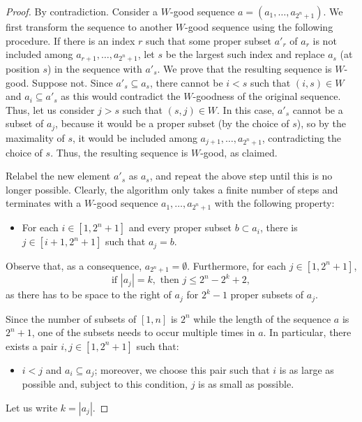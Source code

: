 \documentclass[10pt,a4paper]{amsart}
\newcommand{\size}[1]{\left|#1\right|}
\begin{document}
\begin{proof}
  By contradiction. Consider a $W$-good sequence
  $a = (a_1,\dots,a_{2^n+1})$. We first transform the sequence to another
  $W$-good sequence using the following procedure. If there is an
  index $r$ such that some proper subset $a'_r$ of $a_r$ is not
  included among $a_{r+1},\dots,a_{2^n+1}$, let $s$ be the largest
  such index and replace $a_s$ (at position $s$) in the sequence with
  $a'_s$. We prove that the resulting sequence is $W$-good. Suppose
  not. Since $a'_s\subseteq a_s$, there cannot be $i < s$ such that
  $(i,s)\in W$ and $a_i\subseteq a'_s$ as this would contradict the
  $W$-goodness of the original sequence. Thus, let us consider $j > s$
  such that $(s,j)\in W$. In this case, $a'_s$ cannot be a subset of
  $a_j$, because it would be a proper subset (by the choice of $s$),
  so by the maximality of $s$, it would be included among
  $a_{j+1},\dots,a_{2^n+1}$, contradicting the choice of $s$. Thus,
  the resulting sequence is $W$-good, as claimed.

  Relabel the new element $a'_s$ as $a_s$, and repeat the above step
  until this is no longer possible. Clearly, the
  algorithm only takes a finite number of steps and terminates with a
  $W$-good sequence $a_1,\dots,a_{2^n+1}$ with the following property:
  \begin{itemize}
  \item[] For each $i\in [1,2^n+1]$ and every proper subset $b \subset a_i$, there is $j \in [i+1,2^n+1]$ such that $a_j = b$.
  \end{itemize}
 
  Observe that, as a
  consequence, $a_{2^n+1} = \emptyset$. Furthermore, for each
  $j\in[1,2^n+1]$,
  \begin{equation}
    \label{eq:1}
    \text{if }\size{a_j} = k, \text{ then } j \leq 2^n - 2^k + 2,
  \end{equation}
  as there has to be space to the right of $a_j$ for $2^k-1$ proper
  subsets of $a_j$.

  Since the number of subsets of $[1,n]$ is $2^n$ while the length of the sequence
  $a$ is $2^n+1$, one of the subsets needs to occur multiple times in $a$. In particular, there exists a pair $i,j\in [1,2^n+1]$
  such that:
  \begin{itemize} 
    \item[] $i < j$ and $a_i \subseteq a_j$; moreover, we choose this pair
  such that $i$ is as large as possible and, subject to this condition, $j$ is as small as possible.
  \end{itemize}
  Let us write $k = \size{a_j}$. 


\end{proof}
\end{document}
